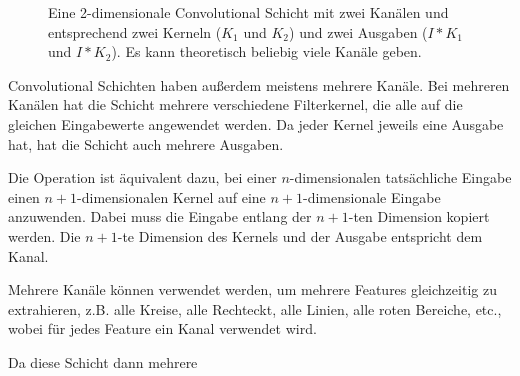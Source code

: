 \documentclass[10pt]{article}
\begin{document}
\begin{figure}[h!]
    \caption{Eine 2-dimensionale Convolutional Schicht mit zwei Kanälen und entsprechend zwei Kerneln ($K_1$ und $K_2$) und zwei Ausgaben ($I*K_1$ und $I*K_2$). Es kann theoretisch beliebig viele Kanäle geben.}
    \label{fig:conv_layers_channels}
\end{figure}

Convolutional Schichten haben außerdem meistens mehrere Kanäle. 
Bei mehreren Kanälen hat die Schicht mehrere verschiedene Filterkernel, die alle auf die gleichen Eingabewerte angewendet werden.
Da jeder Kernel jeweils eine Ausgabe hat, hat die Schicht auch mehrere Ausgaben.

Die Operation ist äquivalent dazu, bei einer $n$-dimensionalen tatsächliche Eingabe einen $n+1$-dimensionalen Kernel auf eine $n+1$-dimensionale Eingabe anzuwenden.
Dabei muss die Eingabe entlang der $n+1$-ten Dimension kopiert werden. Die $n+1$-te Dimension des Kernels und der Ausgabe entspricht dem Kanal.

Mehrere Kanäle können verwendet werden, um mehrere Features gleichzeitig zu extrahieren, z.B. alle Kreise, alle Rechteckt, alle Linien, alle roten Bereiche, etc., wobei für jedes Feature ein Kanal verwendet wird.

Da diese Schicht dann mehrere 


\end{document}
